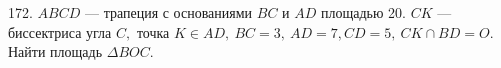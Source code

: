 172. $ABCD$ --- трапеция с основаниями $BC$ и $AD$ площадью 20. $CK$ --- биссектриса угла $C,$ точка $K\in AD,\ BC=3,\ AD=7, CD=5,\ CK\cap BD=O.$ Найти площадь $\Delta BOC.$\\
